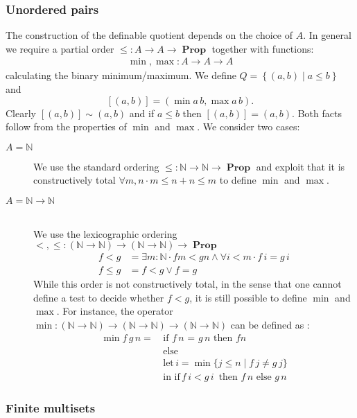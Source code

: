 \documentclass[envcountsame]{llncs}
\newcommand{\N}{\mathbb{N}}
\providecommand{\set}  [1]{\left\{#1\right\}}
\DeclareMathOperator{\Prop}{\mathbf{Prop}}
\begin{document}
\subsubsection*{Unordered pairs}

The construction of the definable quotient depends on the choice of $A$. In general we
require a partial order $\leq : A \to A \to \Prop$ together with functions:
\begin{align*}
\min, \max : A \to A \to A
\end{align*}
calculating the binary minimum/maximum. We define $Q = \set{(a , b) \mid  a \leq b}$ and
\[ [(a,b)] = (\min a\, b, \max a \,b).\]
Clearly $[(a,b)] \sim (a,b)$ and if $a\leq b$ then $[(a,b)]=(a,b)$. Both facts follow from
 the properties of $\min$ and $\max$. We consider two cases:
\begin{description}
\item[$A = \N$] \hfill

We use the standard ordering $\leq : \N \to \N \to \Prop$ and exploit
that it is constructively total $\forall m ,n\cdot m \leq n + n \leq m$ to define $\min$ and
$\max$.
\item[$A=\N\to\N$] \hfill\\
We use the lexicographic ordering ${<},{\leq}:(\N \to \N) \to (\N\to\N)\to\Prop$
\begin{align*}
f < g & = \exists m:\N \cdot f m < g n \wedge \forall i<m\cdot f\,i = g \,i\\
f \leq g &= f < g \vee f=g
\end{align*}
While this order is not constructively total, in the sense that one cannot define a test to decide whether $f<g$, it is still possible to define $\min$ and $\max$.
For instance, the operator $\min : (\N \to \N) \to (\N\to\N) \to (\N \to \N)$ can be defined as :
\begin{align*}
 \min f\,g\,n =\,&\text{if $f \,n$ = $g\,n$ then $f n$}\\
                 &\text{else }\\
                 &\text{let}\,i = \min \{ j \leq n \mid f\,j \not= g\,j \}\\
                 &\text{in }\text{if}\, f\,i< g\,i\,\text{ then } f\,n \text{ else } g\,n
\end{align*}
\end{description}


\subsubsection*{Finite multisets}
\end{document}
